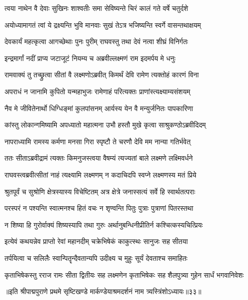 \twolineshloka
{त्वया नाथेन वै देवाः सुखिनः शाश्वतीः समा}
{सेविष्यन्ते चिरं कालं गते वर्षे चतुर्दशे} %

\twolineshloka
{अयोध्यामागतं त्वां ये द्रक्ष्यन्ति भुवि मानवाः}
{सुखं तेऽत्र भजिष्यन्ति स्वर्गे वासन्तथाक्षयम्} %

\twolineshloka
{देवकार्यं महत्कृत्वा आगच्छेथाः पुनः पुरीम्}
{राघवस्तु तथा देवं नत्वा शीघ्रं विनिर्गतः} %

\twolineshloka
{इन्द्रमार्गां नदीं प्राप्य जटाजूटं नियम्य च}
{अब्रवील्लक्ष्मणं राम इदमर्पय मे धनुः} %

\twolineshloka
{रामवाक्यं तु तच्छ्रुत्वा सीतां वै लक्ष्मणोऽब्रवीत्}
{किमर्थं देवि रामेण त्यक्तोहं कारणं विना} %

\twolineshloka
{अपराधं न जानामि कुपितो यन्महाभुजः}
{रामेणाहं परित्यक्तः प्राणांस्त्यक्ष्याम्यसंशयम्} %

\twolineshloka
{नैव मे जीवितेनार्थो धिग्धिङ्मां कुलपांसनम्}
{आर्यस्य येन वै मन्युर्जनितः पापकारिणा} %

\twolineshloka
{कांस्तु लोकान्गमिष्यामि अपध्यातो महात्मना}
{उभौ हस्तौ मुखे कृत्वा साश्रुकण्ठोऽब्रवीदिदम्} %

\twolineshloka
{नापराध्यामि रामस्य कर्मणा मनसा गिरा}
{स्पृष्टौ ते चरणौ देवि मम नान्या गतिर्भवेत्} %

\twolineshloka
{ततः सीताऽब्रवीद्रामं त्यक्तः किमनुजस्त्वया}
{वैषम्यं त्यज्यतां बाले लक्ष्मणे लक्ष्मिवर्धने} %

\twolineshloka
{राघवस्त्वब्रवीत्सीतां नाहं त्यक्ष्यामि लक्ष्मणम्}
{न कदाचिदपि स्वप्ने लक्ष्मणस्य मतं प्रिये} %

\twolineshloka
{श्रुतपूर्वं च सुश्रोणि क्षेत्रस्यास्य विचेष्टितम्}
{अत्र क्षेत्रे जनास्सत्यं सर्वे हि स्वार्थतत्पराः} %

\twolineshloka
{परस्परं न पश्यन्ति स्वात्मनश्च हितं वचः}
{न शृण्वन्ति पितुः पुत्राः पुत्राणां पितरस्तथा} %

\twolineshloka
{न शिष्या हि गुरोर्वाक्यं शिष्यस्यापि तथा गुरुः}
{अर्थानुबन्धिनीप्रीतिर्न कश्चित्कस्यचित्प्रियः} %

\twolineshloka
{इत्येवं कथयन्नेव प्राप्तो रेवां महानदीम्}
{चक्रेभिषेकं काकुत्स्थः सानुजः सह सीतया} %

\twolineshloka
{तर्पयित्वा च सलिलैः स्वान्पितॄन्दैवतान्यपि}
{उदीक्ष्य च मुहुः सूर्यं देवताश्च समाहितः} %

\twolineshloka
{कृताभिषेकस्तु रराज रामः सीता द्वितीयः सह लक्ष्मणेन}
{कृताभिषेकः सह शैलपुत्र्या गुहेन सार्धं भगवानिवेशः} %

॥इति श्रीपाद्मपुराणे प्रथमे सृष्टिखण्डे मार्कण्डेयाश्रमदर्शनं नाम त्र्यस्त्रिंशोऽध्यायः॥३३॥
